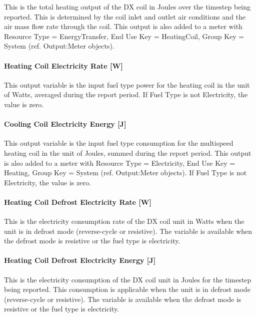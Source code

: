 This is the total heating output of the DX coil in Joules over the timestep being reported. This is determined by the coil inlet and outlet air conditions and the air mass flow rate through the coil. This output is also added to a meter with Resource Type = EnergyTransfer, End Use Key = HeatingCoil, Group Key = System (ref. Output:Meter objects).

\paragraph{Heating Coil Electricity Rate {[}W{]}}

This output variable is the input fuel type power for the heating coil in the unit of Watts, averaged during the report period. If Fuel Type is not Electricity, the value is zero.

\paragraph{Cooling Coil Electricity Energy {[}J{]}}\label{cooling-coil-electric-energy-j-2}

This output variable is the input fuel type consumption for the multispeed heating coil in the unit of Joules, summed during the report period. This output is also added to a meter with Resource Type = Electricity, End Use Key = Heating, Group Key = System (ref. Output:Meter objects). If Fuel Type is not Electricity, the value is zero.

\paragraph{Heating Coil Defrost Electricity Rate {[}W{]}}\label{heating-coil-defrost-electric-power-w-1}

This is the electricity consumption rate of the DX coil unit in Watts when the unit is in defrost mode (reverse-cycle or resistive). The variable is available when the defrost mode is resistive or the fuel type is electricity.

\paragraph{Heating Coil Defrost Electricity Energy {[}J{]}}\label{heating-coil-defrost-electric-energy-j-1}

This is the electricity consumption of the DX coil unit in Joules for the timestep being reported. This consumption is applicable when the unit is in defrost mode (reverse-cycle or resistive). The variable is available when the defrost mode is resistive or the fuel type is electricity.


